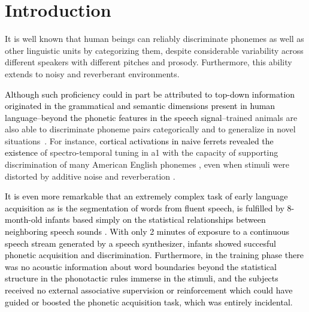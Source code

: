 \documentclass[10pt,letterpaper]{article}
\newcommand{\reviewertwo}[1]{\textcolor{black}{#1}}
\newcommand{\reviewerfour}[1]{\textcolor{black}{#1}}
\newcommand{\reviewerfive}[1]{\textcolor{black}{#1}}
\begin{document}
\section*{Introduction}





It is well known that human beings can reliably discriminate phonemes as well as other linguistic units by categorizing them, despite considerable variability across different speakers with different pitches and prosody. Furthermore, this ability extends to noisy and reverberant environments.

\reviewerfive{Although such proficiency could in part be attributed to top-down information \cite{PMID:17451657} originated in the grammatical and semantic \cite{OBLESER2011713,10.1093/cercor/bhp128} dimensions present in human language--beyond the phonetic features in the speech signal}--trained animals are also able to discriminate phoneme pairs categorically and to generalize in novel situations~\cite{kuhl_1975, kuhl_1983, kluender_1998, pons_2006, hienz_1996, dent_1997, lotto_1997}. For instance, \reviewertwo{cortical activations in naive ferrets revealed the existence} of spectro-temporal tuning in \gls{a1} with the capacity of supporting discrimination of many American English phonemes \cite{mesgarani_2008}, even when stimuli were distorted by additive noise and reverberation \cite{mesgarani_2014A}.

\reviewerfour{It is even more remarkable that an extremely complex task of early language acquisition as is the segmentation of words from fluent speech, is fulfilled by 8-month-old infants based simply on the statistical relationships between neighboring speech sounds \cite{Saffran1996StatisticalLB}. With only 2 minutes of exposure to a continuous speech stream generated by a speech synthesizer, infants showed succesful phonetic acquisition and discrimination. Furthermore, in the training phase there was no acoustic information about word boundaries beyond the statistical structure in the phonotactic rules immerse in the stimuli, and the subjects received no external associative supervision or reinforcement which could have guided or boosted the phonetic acquisition task, which was entirely incidental}.
\end{document}
